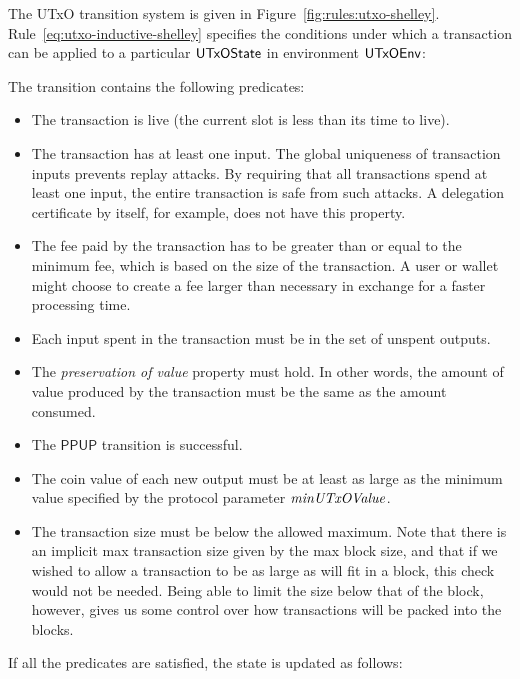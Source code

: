 The UTxO transition system is given in Figure~\ref{fig:rules:utxo-shelley}.
Rule~\ref{eq:utxo-inductive-shelley} specifies the conditions under which a transaction can
be applied to a particular $\mathsf{UTxOState}$ in environment $\mathsf{UTxOEnv}$:

The transition contains the following predicates:

\begin{itemize}
  \item
    The transaction is live (the current slot is less than its time to live).
  \item
    The transaction has at least one input.
    The global uniqueness of transaction inputs prevents replay attacks.
    By requiring that all transactions spend at least one input,
    the entire transaction is safe from such attacks.
    A delegation certificate by itself, for example, does not have this property.
  \item
    The fee paid by the transaction has to be greater than or equal to the minimum fee,
    which is based on the size of the transaction.
    A user or wallet might choose to create a fee larger than necessary
    in exchange for a faster processing time.
  \item
    Each input spent in the transaction must be in the set of unspent
    outputs.
  \item
    The \textit{preservation of value} property must hold.
    In other words, the amount of value produced by the transaction must be the same as
    the amount consumed.
  \item
    The $\mathsf{PPUP}$ transition is successful.
  \item
    The coin value of each new output must be at least as large as the
    minimum value specified by the protocol parameter $\mathit{minUTxOValue}$.
  \item
    The transaction size must be below the allowed maximum.
    Note that there is an implicit max transaction size given by the max block size,
    and that if we wished to allow a transaction to be as large as will fit in a block, this
    check would not be needed.
    Being able to limit the size below that of the block, however, gives us some
    control over how transactions will be packed into the blocks.
\end{itemize}
If all the predicates are satisfied, the state is updated as follows:

